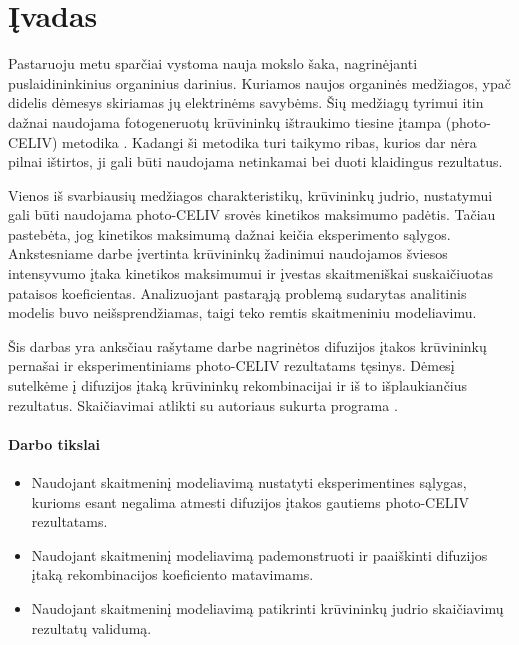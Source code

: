 \section{Įvadas}

Pastaruoju metu sparčiai vystoma nauja mokslo šaka, nagrinėjanti puslaidininkinius organinius darinius. Kuriamos naujos organinės medžiagos, ypač didelis dėmesys skiriamas jų elektrinėms savybėms. Šių medžiagų tyrimui itin dažnai naudojama fotogeneruotų krūvininkų ištraukimo tiesine įtampa (photo-CELIV) metodika \cite{juška:4946}. Kadangi ši metodika turi taikymo ribas, kurios dar nėra pilnai ištirtos, ji gali būti naudojama netinkamai bei duoti klaidingus rezultatus.

Vienos iš svarbiausių medžiagos charakteristikų, krūvininkų judrio, nustatymui gali būti naudojama photo-CELIV srovės kinetikos maksimumo padėtis. Tačiau pastebėta, jog kinetikos maksimumą dažnai keičia eksperimento sąlygos. Ankstesniame darbe įvertinta krūvininkų žadinimui naudojamos šviesos intensyvumo įtaka kinetikos maksimumui \cite{juška:155202} ir įvestas skaitmeniškai suskaičiuotas pataisos koeficientas. Analizuojant pastarąją problemą sudarytas analitinis modelis buvo neišsprendžiamas, taigi teko remtis skaitmeniniu modeliavimu. 

Šis darbas yra anksčiau rašytame darbe \cite{vytis:kursinis} nagrinėtos difuzijos įtakos krūvininkų pernašai ir eksperimentiniams photo-CELIV rezultatams tęsinys. Dėmesį sutelkėme į difuzijos įtaką krūvininkų rekombinacijai ir iš to išplaukiančius rezultatus. Skaičiavimai atlikti su autoriaus sukurta programa \cite{vytis:openreadings2010}. 

\paragraph{Darbo tikslai}
\begin{itemize}
\item Naudojant skaitmeninį modeliavimą nustatyti eksperimentines sąlygas, kurioms esant negalima atmesti difuzijos įtakos gautiems photo-CELIV rezultatams.
\item Naudojant skaitmeninį modeliavimą pademonstruoti ir paaiškinti difuzijos įtaką rekombinacijos koeficiento matavimams.
\item Naudojant skaitmeninį modeliavimą patikrinti krūvininkų judrio skaičiavimų rezultatų validumą.
\end{itemize}
